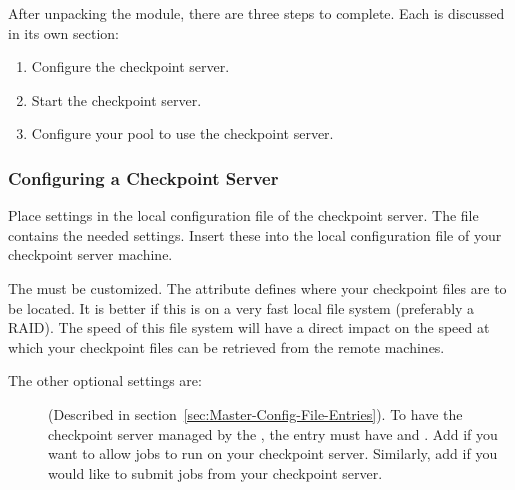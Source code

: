 After unpacking the module, there are three steps
to complete.
Each is discussed in its own section:
\begin{enumerate}
\item Configure the checkpoint server.
\item Start the checkpoint server.
\item Configure your pool to use the checkpoint server.
\end{enumerate}

\subsubsection{\label{Configure-Ckpt-Server}
Configuring a Checkpoint Server} 

Place settings in the local configuration file of
the checkpoint server.
The file  contains
the needed settings. Insert these into the local
configuration file of your checkpoint server machine. 

The   
must be customized.
The  attribute defines where your checkpoint files
are to be located. 
It is better if this is on a very fast local file system (preferably a
RAID). 
The speed of this file system will have a direct impact on the speed
at which your checkpoint files can be retrieved from the remote
machines. 

The other optional settings are:
\begin{description}

\item[] (Described in
section~\ref{sec:Master-Config-File-Entries}).  
To have the checkpoint server managed by the , the
 entry must have  and .
Add  if you want to allow jobs to run on your checkpoint server.
Similarly, add  if you would like to submit jobs from your
checkpoint server. 

\end{description}

